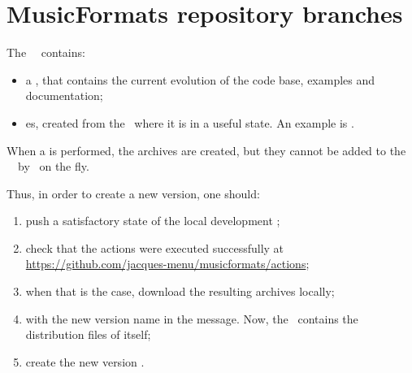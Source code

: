 
\chapter{MusicFormats repository branches}\label{MusicFormats repository branches}

The \mf\ \repo\ contains:
\begin{itemize}
\item a \masterBranch, that contains the current evolution of the code base, examples and documentation;
\item {} \branch es, created from the \masterBranch\ where it is in a useful state. An example is .
\end{itemize}

When a  is performed, the  archives are created, but they cannot be added to the \mf\ \repo\ by \github\ on the fly.

Thus, in order to create a new version, one should:
\begin{enumerate}
\item push a satisfactory state of the local development \repo;
\item check that the actions were executed successfully at \url{https://github.com/jacques-menu/musicformats/actions};
\item when that is the case, download the resulting  archives locally;
\item {} with the new version name in the  message. Now, the \masterBranch\ contains the distribution files of itself;
\item create the new version \branch.
\end{enumerate}
